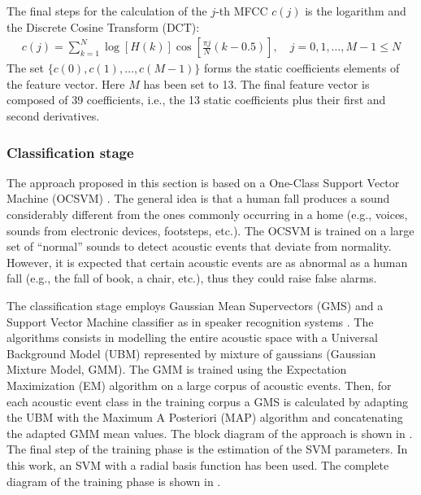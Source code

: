 The final steps for the calculation of the $j$-th MFCC $c(j)$ is the logarithm and the Discrete Cosine Transform (DCT):
\begin{equation}
\begin{aligned}
c(j) = \sum_{k=1}^{N}\log \left[ H(k)\right] \cos\left[\frac{\pi j}{N}(k-0.5)\right], \quad j=0,1,\ldots,M-1\leq N
\end{aligned}
\end{equation}
The set $\{c(0),c(1),\ldots,c(M-1)\}$ forms the static coefficients elements of the feature vector. Here $M$ has been set to 13. The final feature vector is composed of 39 coefficients, i.e., the 13 static coefficients plus their first and second derivatives. %


\subsubsection{Classification stage}
\label{sec:svm_multi_classification}
The approach proposed in this section is based on a One-Class Support Vector Machine (OCSVM) \cite{scholkopf2000}. The general idea is that a human fall produces a sound considerably different from the ones commonly occurring in a home (e.g., voices, sounds from electronic devices, footsteps, etc.). The OCSVM is trained on a large set of ``normal'' sounds to detect acoustic events that deviate from normality. However, it is expected that certain acoustic events are as abnormal as a human fall (e.g., the fall of book, a chair, etc.), thus they could raise false alarms. 



The classification stage employs Gaussian Mean Supervectors (GMS) and a Support Vector Machine classifier as in speaker recognition systems \cite{kinnunen10}. The algorithms consists in modelling the entire acoustic space with a Universal Background Model (UBM) represented by mixture of gaussians (Gaussian Mixture Model, GMM). The GMM is trained using the Expectation Maximization (EM) algorithm \cite{bilmes1998gentle} on a large corpus of acoustic events. Then, for each acoustic event class in the training corpus a GMS is calculated by adapting the UBM with the Maximum A Posteriori (MAP) algorithm \cite{reynolds10} and concatenating the adapted GMM mean values. The block diagram of the approach is shown in . The final step of the training phase is the estimation of the SVM parameters. In this work, an SVM with a radial basis function has been used. The complete diagram of the training phase is shown in .

